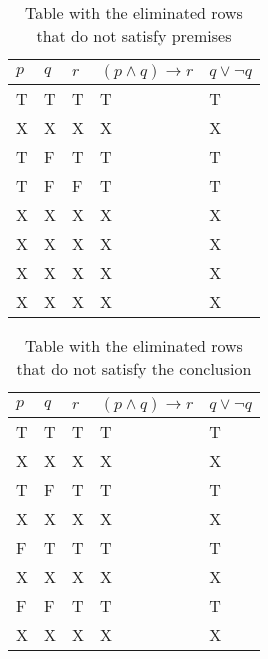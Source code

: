 \documentclass[12pt]{article}
\begin{document}
\begin{table}[H]
    \centering
    \begin{tabular}{|l|l|l|l|l|}
        \hline
        $p$ & $q$ & $r$ & $ (p \wedge q) \rightarrow r  $ & $ q \vee \neg q $ \\ \hline
        T   & T   & T   & T                               & T                 \\ \hline
        X   & X   & X   & X                               & X                 \\ \hline
        T   & F   & T   & T                               & T                 \\ \hline
        T   & F   & F   & T                               & T                 \\ \hline
        X   & X   & X   & X                               & X                 \\ \hline
        X   & X   & X   & X                               & X                 \\ \hline
        X   & X   & X   & X                               & X                 \\ \hline
        X   & X   & X   & X                               & X                 \\ \hline
    \end{tabular} 

    \caption{Table with the eliminated rows that do not satisfy premises}
    \label{t2}
\end{table}

\begin{table}[H]
    \centering
    \begin{tabular}{|l|l|l|l|l|}
        \hline
        $p$ & $q$ & $r$ & $ (p \wedge q) \rightarrow r  $ & $ q \vee \neg q $ \\ \hline
        T   & T   & T   & T                               & T                 \\ \hline
        X   & X   & X   & X                               & X                 \\ \hline
        T   & F   & T   & T                               & T                 \\ \hline
        X   & X   & X   & X                               & X                 \\ \hline
        F   & T   & T   & T                               & T                 \\ \hline
        X   & X   & X   & X                               & X                 \\ \hline
        F   & F   & T   & T                               & T                 \\ \hline
        X   & X   & X   & X                               & X                 \\ \hline
    \end{tabular}

    \caption{Table with the eliminated rows that do not satisfy the conclusion}
    \label{t3}
\end{table}
\end{document}
